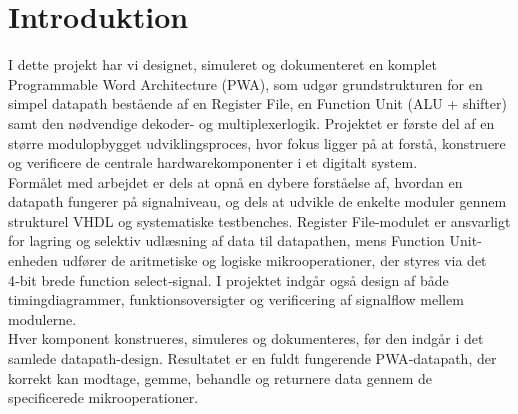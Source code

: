 \documentclass{article}
\begin{document}
\fi

\section{Introduktion}
\label{sec:intro}
I dette projekt har vi designet, simuleret og dokumenteret en komplet Programmable Word Architecture (PWA), som udgør grundstrukturen for en simpel datapath bestående af en Register File, en Function Unit (ALU + shifter) samt den nødvendige dekoder- og multiplexerlogik. Projektet er første del af en større modulopbygget udviklingsproces, hvor fokus ligger på at forstå, konstruere og verificere de centrale hardwarekomponenter i et digitalt system.\\
Formålet med arbejdet er dels at opnå en dybere forståelse af, hvordan en datapath fungerer på signalniveau, og dels at udvikle de enkelte moduler gennem strukturel VHDL og systematiske testbenches. Register File-modulet er ansvarligt for lagring og selektiv udlæsning af data til datapathen, mens Function Unit-enheden udfører de aritmetiske og logiske mikrooperationer, der styres via det 4‑bit brede function select‑signal. I projektet indgår også design af både timingdiagrammer, funktionsoversigter og verificering af signalflow mellem modulerne.\\ Hver komponent konstrueres, simuleres og dokumenteres, før den indgår i det samlede datapath-design. Resultatet er en fuldt fungerende PWA‑datapath, der korrekt kan modtage, gemme, behandle og returnere data gennem de specificerede mikrooperationer.

\ifdefined\mainfile\else
\end{document}
